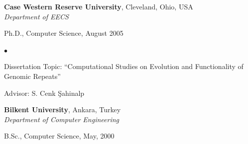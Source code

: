 \documentclass[margin,line]{res}
\newenvironment{list1}{
  \begin{list}{\ding{113}}{%
      \setlength{\itemsep}{0in}
      \setlength{\parsep}{0in} \setlength{\parskip}{0in}
      \setlength{\topsep}{0in} \setlength{\partopsep}{0in} 
      \setlength{\leftmargin}{0.17in}}}{\end{list}}
\newenvironment{list2}{
  \begin{list}{$\bullet$}{%
      \setlength{\itemsep}{0.1cm}
      \setlength{\parsep}{0in} \setlength{\parskip}{0in}
      \setlength{\topsep}{0in} \setlength{\partopsep}{0in} 
      \setlength{\leftmargin}{0.2in}}}{\end{list}}
\newcommand{\junk}[1]{}
\begin{document}
\begin{resume}
          {\bf Case Western Reserve University}, Cleveland, Ohio, USA\\
          {\em Department of EECS} \\
          \vspace*{-.1in}
          \begin{list1}
          \item[] Ph.D., Computer Science, August 2005
            \begin{list2}
              \vspace*{.05in}
            \item Dissertation Topic:  ``Computational Studies on Evolution and Functionality of Genomic Repeats''
            \item Advisor:  S. Cenk \c{S}ahinalp
            \end{list2}
          \end{list1}
          
          {\bf Bilkent University}, Ankara, Turkey \\
          {\em Department of Computer Engineering}\\ 
          \vspace*{-.1in}
          \begin{list1}
          \item[] B.Sc., Computer Science,  May, 2000
          \end{list1}
          
          \junk{
            \section{\sc Academic Experience}
                    {\bf Case Western Reserve University}, Cleveland, Ohio, USA\\
                    
                    \vspace{-.2cm}
                           {\em Graduate Student \& Research Assistant} \hfill {\bf August, 2000
                             - August 2005}\\
                           Included  Ph.D.~research, Ph.D. level course work and
                           research projects, reviewing papers for bioinformatics, algorithms and
                           database conferences and journals.
                           
                           {\em Teaching Assistant} \hfill {\bf August, 2000  - May 2001}\\
                           Duties included grading homeworks, and office hours. 
                           \begin{list2}
                           \item Systems Programming, Fall 2000
                           \item Introduction to Bioinformatics, Fall 2001
                           \item Analysis of Algorithms, Spring 2001
                           \end{list2}
          }
          

\end{resume}
\end{document}
